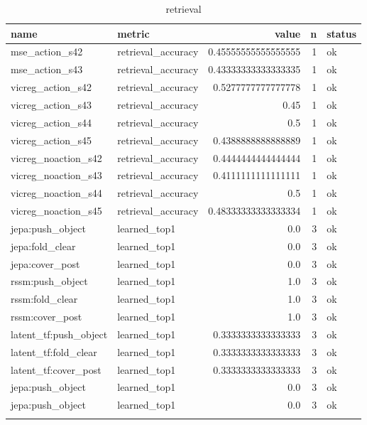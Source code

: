 \begin{table}
\centering
\begin{tabular}{llrrl}
name & metric & value & n & status \\
\hline
mse\_action\_s42 & retrieval\_accuracy & 0.45555555555555555 & 1 & ok \\
mse\_action\_s43 & retrieval\_accuracy & 0.43333333333333335 & 1 & ok \\
vicreg\_action\_s42 & retrieval\_accuracy & 0.5277777777777778 & 1 & ok \\
vicreg\_action\_s43 & retrieval\_accuracy & 0.45 & 1 & ok \\
vicreg\_action\_s44 & retrieval\_accuracy & 0.5 & 1 & ok \\
vicreg\_action\_s45 & retrieval\_accuracy & 0.4388888888888889 & 1 & ok \\
vicreg\_noaction\_s42 & retrieval\_accuracy & 0.4444444444444444 & 1 & ok \\
vicreg\_noaction\_s43 & retrieval\_accuracy & 0.4111111111111111 & 1 & ok \\
vicreg\_noaction\_s44 & retrieval\_accuracy & 0.5 & 1 & ok \\
vicreg\_noaction\_s45 & retrieval\_accuracy & 0.48333333333333334 & 1 & ok \\
jepa:push\_object & learned\_top1 & 0.0 & 3 & ok \\
jepa:fold\_clear & learned\_top1 & 0.0 & 3 & ok \\
jepa:cover\_post & learned\_top1 & 0.0 & 3 & ok \\
rssm:push\_object & learned\_top1 & 1.0 & 3 & ok \\
rssm:fold\_clear & learned\_top1 & 1.0 & 3 & ok \\
rssm:cover\_post & learned\_top1 & 1.0 & 3 & ok \\
latent\_tf:push\_object & learned\_top1 & 0.3333333333333333 & 3 & ok \\
latent\_tf:fold\_clear & learned\_top1 & 0.3333333333333333 & 3 & ok \\
latent\_tf:cover\_post & learned\_top1 & 0.3333333333333333 & 3 & ok \\
jepa:push\_object & learned\_top1 & 0.0 & 3 & ok \\
jepa:push\_object & learned\_top1 & 0.0 & 3 & ok \\
\caption{retrieval}
\end{tabular}
\end{table}
